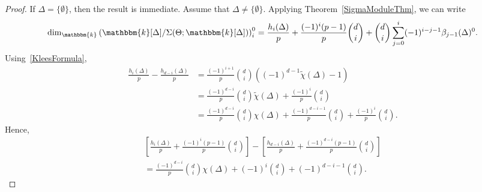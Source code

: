 \documentclass[ALCO,ThmDefs,Unicode]{cedram}
\newcommand{\field}{\mathbbm{k}}
\begin{document}
\begin{proof}
If $\Delta=\{\emptyset\}$, then the result is immediate. Assume that $\Delta\not=\{\emptyset\}$. Applying Theorem~\ref{SigmaModuleThm}, we can write
\[
\dim_\field \left(\field[\Delta]/\Sigma(\Theta;\field[\Delta])\right)_i^0=\frac{h_i(\Delta)}{p}+\frac{(-1)^i(p-1)}{p}\binom{d}{i}+\binom{d}{i}\sum_{j=0}^i(-1)^{i-j-1}\beta_{j-1}(\Delta)^0.
\]
Using~\eqref{KleesFormula},
\begin{align*}
\frac{h_i(\Delta)}{p}-\frac{h_{d-i}(\Delta)}{p}&=\frac{(-1)^{i+1}}{p}\binom{d}{i}((-1)^{d-1}\tilde{\chi}(\Delta)-1)\\
&=\frac{(-1)^{d-i}}{p}\binom{d}{i}\tilde{\chi}(\Delta)+\frac{(-1)^i}{p}\binom{d}{i}\\
&=\frac{(-1)^{d-i}}{p}\binom{d}{i}\chi(\Delta)+\frac{(-1)^{d-i-1}}{p}\binom{d}{i}+\frac{(-1)^i}{p}\binom{d}{i}.
\end{align*}
Hence,
\begin{multline}\label{hVectorDifference}
\left[\frac{h_i(\Delta)}{p}+\frac{(-1)^i(p-1)}{p}\binom{d}{i}\right]-\left[\frac{h_{d-i}(\Delta)}{p}+\frac{(-1)^{d-i}(p-1)}{p}\binom{d}{i}\right]\\
=\frac{(-1)^{d-i}}{p}\binom{d}{i}\chi(\Delta)+(-1)^i\binom{d}{i}+(-1)^{d-i-1}\binom{d}{i}.
\end{multline}


\end{proof}
\end{document}

